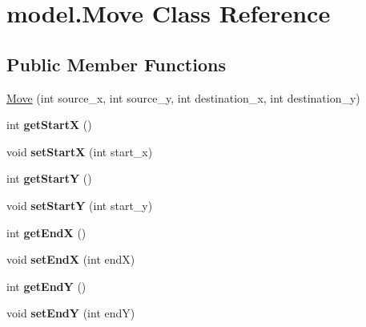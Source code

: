 \hypertarget{classmodel_1_1_move}{\section{model.\-Move Class Reference}
\label{classmodel_1_1_move}
}
\subsection*{Public Member Functions}
\begin{DoxyCompactItemize}
\item 
\hyperlink{classmodel_1_1_move_af1d85554fe51c13fde92a2f41c7c00e6}{Move} (int source\-\_\-x, int source\-\_\-y, int destination\-\_\-x, int destination\-\_\-y)
\item 
\hypertarget{classmodel_1_1_move_a8ee6ceb7ce5fe60edd79db53925a40bf}{int {\bfseries get\-Start\-X} ()}\label{classmodel_1_1_move_a8ee6ceb7ce5fe60edd79db53925a40bf}

\item 
\hypertarget{classmodel_1_1_move_a3bc520b96a831f6b9ac8d2d3984e46c7}{void {\bfseries set\-Start\-X} (int start\-\_\-x)}\label{classmodel_1_1_move_a3bc520b96a831f6b9ac8d2d3984e46c7}

\item 
\hypertarget{classmodel_1_1_move_aad89ec91dcaf1af33e3c66a4f6b8edf3}{int {\bfseries get\-Start\-Y} ()}\label{classmodel_1_1_move_aad89ec91dcaf1af33e3c66a4f6b8edf3}

\item 
\hypertarget{classmodel_1_1_move_ac8a7ff6b106ce31888e42252d4da6b93}{void {\bfseries set\-Start\-Y} (int start\-\_\-y)}\label{classmodel_1_1_move_ac8a7ff6b106ce31888e42252d4da6b93}

\item 
\hypertarget{classmodel_1_1_move_ab2afb0ecae143f0dfd22514315afc36d}{int {\bfseries get\-End\-X} ()}\label{classmodel_1_1_move_ab2afb0ecae143f0dfd22514315afc36d}

\item 
\hypertarget{classmodel_1_1_move_a5e6f011bd7b032c47b6ab69ebbb95617}{void {\bfseries set\-End\-X} (int end\-X)}\label{classmodel_1_1_move_a5e6f011bd7b032c47b6ab69ebbb95617}

\item 
\hypertarget{classmodel_1_1_move_a982f8fea565c0ccc51b9c6419f17fafc}{int {\bfseries get\-End\-Y} ()}\label{classmodel_1_1_move_a982f8fea565c0ccc51b9c6419f17fafc}

\item 
\hypertarget{classmodel_1_1_move_a85051eb48ef15bb0ac68066c3b088ff6}{void {\bfseries set\-End\-Y} (int end\-Y)}\label{classmodel_1_1_move_a85051eb48ef15bb0ac68066c3b088ff6}

\end{DoxyCompactItemize}


